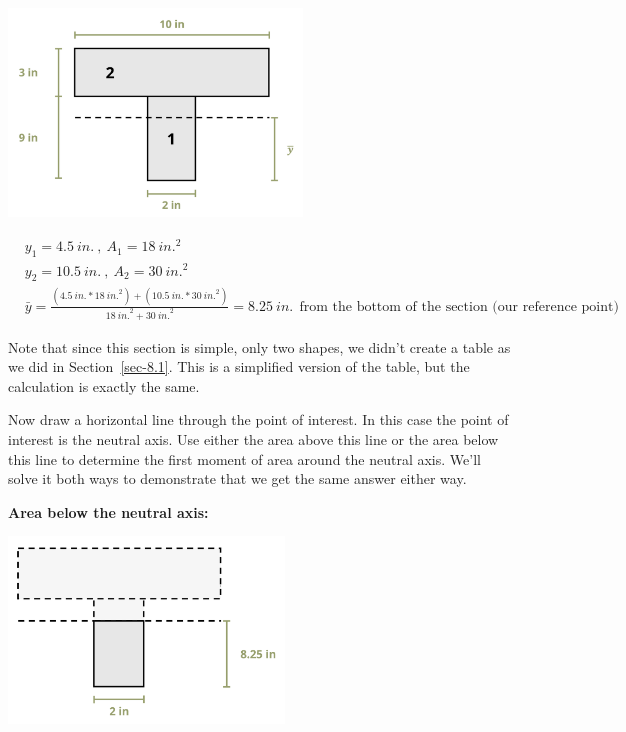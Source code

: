 \documentclass[
  letterpaper,
  DIV=11,
  numbers=noendperiod]{scrreprt}
\theoremstyle{definition}
\theoremstyle{remark}
\begin{document}
\begin{tcolorbox}
\begin{tcolorbox}
\begin{center}
\includegraphics[width=3.07292in,height=\textheight]{images/CH10 PNGs/example 10.1 part 2.png}
\end{center}

\[
\begin{aligned}
& y_1=4.5{~in.}~,~ A_1=18{~in.}^2 \\
& y_2=10.5{~in.}~,~ A_2=30{~in.}^2 \\
& \bar{y}=\frac{(4.5{~in.} * 18{~in.}^2)+(10.5{~in.} * 30{~in.}^2)}{18{~in.}^2+30{~in.}^2}=8.25{~in.}~~\text{from the bottom of the section (our reference point) }
\end{aligned}
\]

Note that since this section is simple, only two shapes, we didn't
create a table as we did in Section~\ref{sec-8.1}. This is a simplified
version of the table, but the calculation is exactly the same.

Now draw a horizontal line through the point of interest. In this case
the point of interest is the neutral axis. Use either the area above
this line or the area below this line to determine the first moment of
area around the neutral axis. We'll solve it both ways to demonstrate
that we get the same answer either way.

\textbf{Area below the neutral axis:}

\begin{center}
\includegraphics[width=2.88542in,height=\textheight]{images/CH10 PNGs/example 10.1 part 3.png}
\end{center}


\end{tcolorbox}
\end{tcolorbox}
\end{document}

